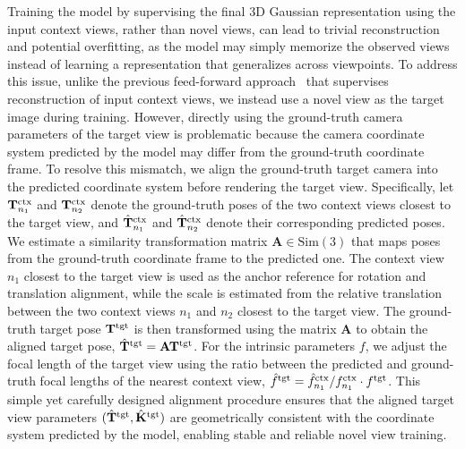  Training the model by supervising the final 3D Gaussian representation using the input context views, rather than novel views, can lead to trivial reconstruction and potential overfitting, as the model may simply memorize the observed views instead of learning a representation that generalizes across viewpoints. To address this issue, unlike the previous feed-forward approach~\cite{jiang2025anysplat} that supervises reconstruction of input context views, we instead use a novel view as the target image during training. 
However, directly using the ground-truth camera parameters of the target view is problematic because the camera coordinate system predicted by the model may differ from the ground-truth coordinate frame. To resolve this mismatch, we align the ground-truth target camera into the predicted coordinate system before rendering the target view.
Specifically, let $\mathbf{T}^{\text{ctx}}_{n_1}$ and $\mathbf{T}^{\text{ctx}}_{n_2}$ denote the ground-truth poses of the two context views closest to the target view, and $\hat{\mathbf{T}}^{\text{ctx}}_{n_1}$ and $\hat{\mathbf{T}}^{\text{ctx}}_{n_2}$ denote their corresponding predicted poses. 
We estimate a similarity transformation matrix $\mathbf{A} \in \mathrm{Sim}(3)$
that maps poses from the ground-truth coordinate frame to the predicted one.
The context view $n_1$ closest to the target view is used as the anchor reference for rotation and translation alignment, while the scale is estimated from the relative translation between the two context views $n_1$ and $n_2$ closest to the target view.
The ground-truth target pose $\mathbf{T}^{\text{tgt}}$ is then transformed using the matrix $\mathbf{A}$ to obtain the aligned target pose, $\hat{\mathbf{T}}^{\text{tgt}} = \mathbf{A} \mathbf{T}^{\text{tgt}}$. For the intrinsic parameters $f$, we adjust the focal length of the target view using the ratio between the predicted and ground-truth focal lengths of the nearest context view, $\hat{f}^{\text{tgt}} = \hat{f}^{\text{ctx}}_{n_1}/ f^{\text{ctx}}_{n_1} \cdot f^{\text{tgt}}$. This simple yet carefully designed alignment procedure ensures that the aligned target view parameters $(\hat{\mathbf{T}}^{\text{tgt}}, \hat{\mathbf{K}}^{\text{tgt}})$ are geometrically consistent with the coordinate system predicted by the model, enabling stable and reliable novel view training.


